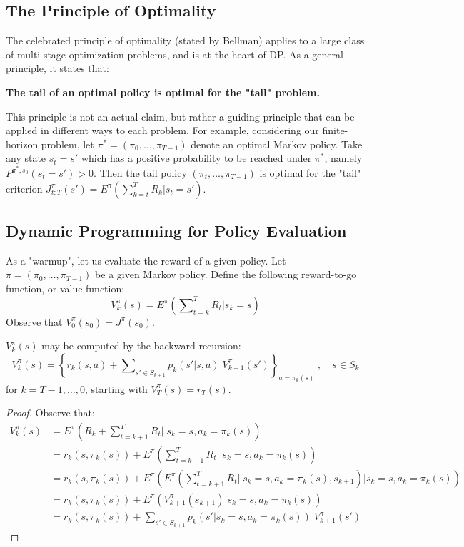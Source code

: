 \subsection{The Principle of Optimality}
The celebrated principle of optimality (stated by Bellman) applies to a large class of multi-stage optimization problems, and is at the heart of DP. As a general principle, it states that:
\begin{center}
\textbf{The tail of an optimal policy is optimal for the "tail" problem.}
\end{center}

This principle is not an actual claim, but rather a guiding principle that can be applied in different ways to each problem.
For example, considering our finite-horizon problem, let ${\pi ^*} = ({\pi _0}, \ldots ,{\pi _{T - 1}})$ denote an optimal Markov policy. Take any state ${s_t} = s'$ which has a positive probability to be reached under ${\pi ^*}$, namely ${P^{\pi^* ,{s_0}}}({s_t} = s') > 0$. Then the tail policy $({\pi _t}, \ldots ,{\pi _{T - 1}})$ is optimal for the "tail" criterion $J_{t:T}^\pi (s') = {E^\pi }\left( {\sum\nolimits_{k = t}^T {{R_k}|{s_t} = s'} } \right)$.


\subsection{Dynamic Programming for Policy Evaluation}\label{sss:pol_eval}
As a "warmup", let us evaluate the reward of a given policy.
Let $\pi  = ({\pi _0}, \ldots ,{\pi _{T - 1}})$ be a given Markov policy. Define the following reward-to-go function, or value function:
\[V_k^\pi (s) = {E^\pi }\left( {\sum\nolimits_{t = k}^T {{R_t}|{s_k} = s} } \right)\]
Observe that $V_0^\pi ({s_0}) = {J^\pi }({s_0})$.

\begin{lemma}\label{lem:finite_horizon_VI} $V_k^\pi (s)$ may be computed by the backward recursion:
\[V_k^\pi (s) = {\left\{ {{r_k}(s,a) + \sum\nolimits_{s' \in {S_{k + 1}}} {{p_k}(s'|s,a)} \;V_{k + 1}^\pi (s')} \right\}_{a = {\pi _k}(s)}}\;,\quad s \in {S_k}\]
for $k =  T - 1, \ldots ,0 $,  starting with  $V_T^\pi (s) = {r_T}(s)$.
\end{lemma}
\begin{proof}
Observe that:
\begin{align*}
V_k^\pi (s) &= {E^\pi }\left( {{R_k} + \sum\nolimits_{t = k + 1}^T {{R_t}|} \;{s_k} = s,{a_k} = {\pi _k}(s)} \right)\\
&= {r_k}({s},{\pi _k}(s)) + {E^\pi }\left( { \sum\nolimits_{t = k + 1}^T {{R_t}|} \;{s_k} = s,{a_k} = {\pi _k}(s)} \right)\\
 &= {r_k}({s},{\pi _k}(s)) + {E^\pi }\left( {{E^\pi }\left( {\sum\nolimits_{t = k + 1}^T {{R_t}} |\;{s_k} = s,{a_k} = {\pi _k}(s),{s_{k + 1}}} \right)|{s_k} = s,{a_k} = {\pi _k}(s)} \right)\\
 &= {r_k}({s},{\pi _k}(s)) + {E^\pi }\left( { V_{k + 1}^\pi ({s_{k + 1}})|{s_k} = s,{a_k} = {\pi _k}(s)} \right)\\
 &= {r_k}(s,{\pi _k}(s)) + \sum\nolimits_{s' \in {S_{k + 1}}} {{p_k}(s'|{s_k} = s,{a_k} = {\pi _k}(s))} \;V_{k + 1}^\pi (s')
\end{align*}
\end{proof}
